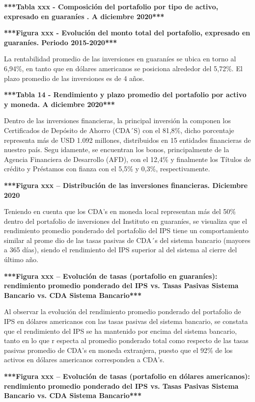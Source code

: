 \textbf{***Tabla xxx - Composición del portafolio por tipo de activo, expresado en guaraníes . A diciembre 2020***}

\textbf{***Figura xxx - Evolución del monto total del portafolio, expresado en guaraníes. Periodo 2015-2020***}

La rentabilidad promedio de las inversiones en guaraníes se ubica en
torno al 6,94\%, en tanto que en dólares americanos se posiciona
alrededor del 5,72\%. El plazo promedio de las inversiones es de 4 años.

\textbf{***Tabla 14 - Rendimiento y plazo promedio del portafolio por activo y moneda. A diciembre 2020***}

Dentro de las inversiones financieras, la principal inversión la
componen los Certificados de Depósito de Ahorro (CDA´S) con el 81,8\%,
dicho porcentaje representa más de USD 1.092 millones, distribuidos en
15 entidades financieras de nuestro país. Segu idamente, se encuentran
los bonos, principalmente de la Agencia Financiera de Desarrollo (AFD),
con el 12,4\% y finalmente los Títulos de crédito y Préstamos con fianza
con el 5,5\% y 0,3\%, respectivamente.

\textbf{***Figura xxx – Distribución de las inversiones financieras. Diciembre 2020}

Teniendo en cuenta que los CDA's en moneda local representan más del
50\% dentro del portafolio de inversiones del Instituto en guaraníes, se
visualiza que el rendimiento promedio ponderado del portafolio del IPS
tiene un comportamiento similar al prome dio de las tasas pasivas de
CDA´s del sistema bancario (mayores a 365 días), siendo el rendimiento
del IPS superior al del sistema al cierre del último año.

\textbf{***Figura xxx – Evolución de tasas (portafolio en guaraníes): rendimiento promedio ponderado del IPS vs. Tasas Pasivas Sistema Bancario vs. CDA Sistema Bancario***}

Al observar la evolución del rendimiento promedio ponderado del
portafolio de IPS en dólares americanos con las tasas pasivas del
sistema bancario, se constata que el rendimiento del IPS se ha mantenido
por encima del sistema bancario, tanto en lo que r especta al promedio
ponderado total como respecto de las tasas pasivas promedio de CDA's en
moneda extranjera, puesto que el 92\% de los activos en dólares
americanos corresponden a CDA's.

\textbf{***Figura xxx  – Evolución de tasas (portafolio en dólares americanos): rendimiento promedio ponderado del IPS vs. Tasas Pasivas Sistema Bancario vs. CDA Sistema Bancario***}
